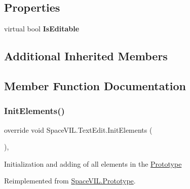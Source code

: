 \subsection*{Properties}
\begin{DoxyCompactItemize}
\item 
\mbox{\label{class_space_v_i_l_1_1_text_edit_a0b27b637cf5745cfdfbd108fb1c5ed0c}} 
virtual bool {\bfseries Is\+Editable}
\end{DoxyCompactItemize}
\subsection*{Additional Inherited Members}


\subsection{Member Function Documentation}
\mbox{\label{class_space_v_i_l_1_1_text_edit_ae84529a6ee07cd77c8420df465510bcf}} 
\subsubsection{\texorpdfstring{Init\+Elements()}{InitElements()}}
{\footnotesize\ttfamily override void Space\+V\+I\+L.\+Text\+Edit.\+Init\+Elements (\begin{DoxyParamCaption}{ }\end{DoxyParamCaption})\hspace{0.3cm}{\ttfamily [inline]}, {\ttfamily [virtual]}}



Initialization and adding of all elements in the \mbox{\hyperlink{class_space_v_i_l_1_1_prototype}{Prototype}} 



Reimplemented from \mbox{\hyperlink{class_space_v_i_l_1_1_prototype_ac3379fe02923ee155b5b0084abf27420}{Space\+V\+I\+L.\+Prototype}}.

\mbox{\label{class_space_v_i_l_1_1_text_edit_ac587be091aa4d1525dfcec90d6105073}} 
